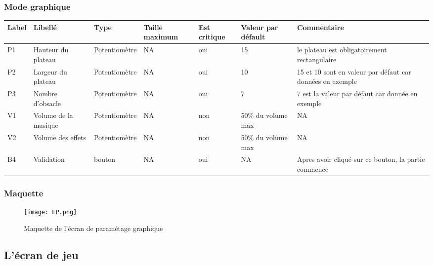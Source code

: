 \documentclass[12pt,a4paper]{article}
\begin{document}
\begin{itemize}
			\subsubsection{Mode graphique}
				\hspace{-3cm}
				\begin{tabular}{|p{1cm}|p{2.5cm}|p{2.5cm}|p{2cm}|p{2.5cm}|p{3cm}|p{3cm}|} %
				\hline
						Label & Libellé & Type & Taille maximum & Est critique & Valeur par défault & Commentaire \\
					\hline \hline
						P1 & Hauteur du plateau & Potentiomètre & NA & oui & 15 & le plateau est obligatoirement rectangulaire \\
						\hline
						P2 & Largeur du plateau & Potentiomètre & NA & oui & 10 & 15 et 10 sont en valeur par défaut car données en exemple \\
						\hline
						P3 & Nombre d'obsacle & Potentiomètre & NA & oui & 7 & 7 est la valeur par défaut car donnée en exemple \\
						\hline
						V1 & Volume de la musique & Potentiomètre & NA & non & 50\% du volume max & NA\\
						\hline
						V2 & Volume des effets & Potentiomètre & NA & non & 50\% du volume max & NA\\
						\hline
						B4 & Validation & bouton & NA & oui & NA & Apres avoir cliqué sur ce bouton, la partie commence\\
					\hline
				\end{tabular}
				\label{Informations présentes sur l'écran de paramétrage graphique}
				\newpage
				\subsubsection*{Maquette}
					\begin{figure}[!h] %
						\texttt{[image: EP.png]}
						\caption{Maquette de l'écran de paramétage graphique}
						\label{Maquette de l'écran de paramétage graphique}
					\end{figure}
					
			
		\subsection{L'écran de jeu}

\end{itemize}
\end{document}
